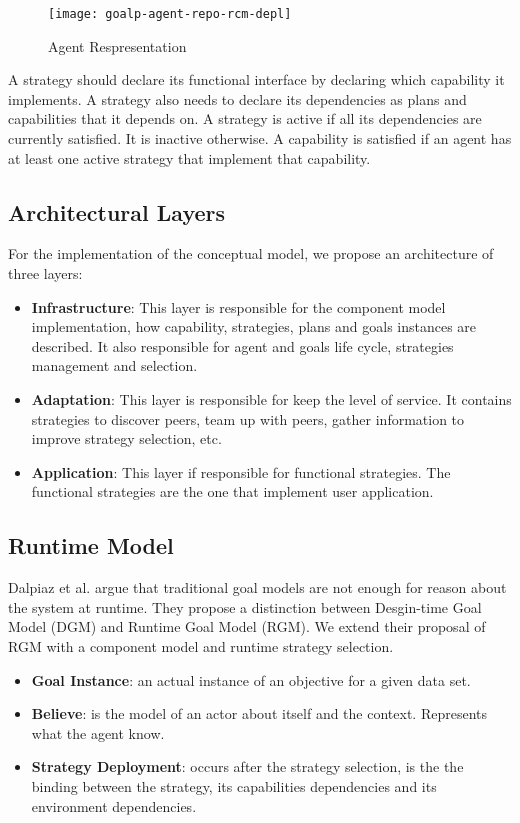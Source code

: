 \begin{figure}
  \centering
  \texttt{[image: goalp-agent-repo-rcm-depl]}
  \caption{Agent Respresentation}
  \label{fig:goalp-agent}
\end{figure}

A strategy should declare its functional interface by declaring which capability it implements. A strategy also needs to declare its dependencies as plans and capabilities that it depends on. A strategy is active if all its dependencies are currently satisfied. It is inactive otherwise. A capability is satisfied if an agent has at least one active strategy that implement that capability.

\subsection{Architectural Layers}

For the implementation of the conceptual model, we propose an architecture of three layers:

\begin{itemize}
  \item \textbf{Infrastructure}: This layer is responsible for the component model implementation, how capability, strategies, plans and goals instances are described. It also responsible for agent and goals life cycle, strategies management and selection.
  \item \textbf{Adaptation}: This layer is responsible for keep the level of service. It contains strategies to discover peers, team up with peers, gather information to improve strategy selection, etc.
  \item \textbf{Application}: This layer if responsible for functional strategies. The functional strategies are the one that implement user application.
\end{itemize}

\subsection{Runtime Model}

Dalpiaz et al. \cite{dalpiaz_runtime_2013} argue that traditional goal models are not enough for reason about the system at runtime. They propose a distinction between Desgin-time Goal Model (DGM) and Runtime Goal Model (RGM). We extend their proposal of RGM with a component model and runtime strategy selection.

\begin{itemize}

\item \textbf{Goal Instance}: an actual instance of an objective for a given data set.

\item \textbf{Believe}: is the model of an actor about itself and the context. Represents what the agent know.

\item \textbf{Strategy Deployment}: occurs after the strategy selection, is the the binding between the strategy, its capabilities dependencies and its environment dependencies.

\end{itemize}

